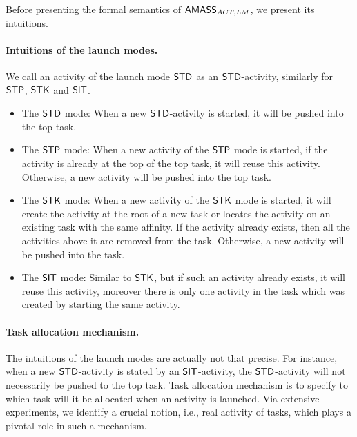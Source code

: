 Before presenting the formal semantics of $\textsf{AMASS}_{ACT,LM}$, we present its intuitions. 
%

\paragraph{Intuitions of the launch modes.}  %
We call an activity of the launch mode ${\sf STD}$ as an ${\sf STD}$-activity, similarly for ${\sf STP}$, ${\sf STK}$ and ${\sf SIT}$. 

\begin{itemize}
\item The ${\sf STD}$ mode: When a new ${\sf STD}$-activity is started, it will be pushed into the top task. 
%
\item The ${\sf STP}$ mode: When a new activity of the ${\sf STP}$ mode is started, if the activity is already at the top of the top task, it will reuse this activity. Otherwise, a new activity will be pushed into the top task.
%
\item The ${\sf STK}$ mode: When a new activity of the ${\sf STK}$ mode is started, it will create the activity at the root of a new task or locates the activity on an existing task with the same affinity. If the activity already exists, then all the activities above it are removed from the task. Otherwise, a new activity will be pushed into the task.
%
\item The ${\sf SIT}$ mode: 
Similar to ${\sf STK}$, but if such an activity already exists, it will reuse this activity, moreover there is only one activity in the task which was created by starting the same activity.
\end{itemize}

\paragraph{Task allocation mechanism.}
The intuitions of the launch modes are actually not that precise. For instance, when a new ${\sf STD}$-activity is stated by an ${\sf SIT}$-activity, the ${\sf STD}$-activity will not necessarily be pushed to the top task. 
Task allocation mechanism is to specify to which task will it be allocated when an activity is launched. Via extensive experiments, we  
identify a crucial notion, i.e., real activity of tasks, 
which plays a pivotal role in such a mechanism. 

